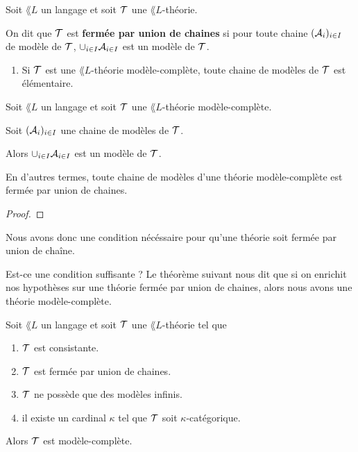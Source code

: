 \documentclass[a4paper, 12pt]{report}
\begin{document}
\begin{definition} 
	Soit $\lang{L}$ un langage et soit $\mathcal{T}$ une $\lang{L}$-théorie.

	On dit que $\mathcal{T}$ est \textbf{fermée par union de chaines} si pour
	toute chaine $(\mathcal{A}_{i})_{i \in I}$ de modèle de $\mathcal{T}$,
	$\cup_{i \in I} \mathcal{A}_{i \in I}$ est un modèle de $\mathcal{T}$.
\end{definition}

\begin{remarque}
	\begin{enumerate}
		\item Si $\mathcal{T}$ est une $\lang{L}$-théorie modèle-complète, toute
			chaine de modèles de $\mathcal{T}$ est élémentaire.
	\end{enumerate}
\end{remarque}

\begin{corollary}
	Soit $\lang{L}$ un langage et soit $\mathcal{T}$ une $\lang{L}$-théorie modèle-complète.

	Soit $(\mathcal{A}_{i})_{i \in I}$ une chaine de modèles de $\mathcal{T}$.

	Alors $\cup_{i \in I} \mathcal{A}_{i \in I}$ est un modèle de $\mathcal{T}$.

	En d'autres termes, toute chaine de modèles d'une théorie modèle-complète est
	fermée par union de chaines.
\end{corollary}

\ifdefined\outputproof
\begin{proof}

\end{proof}
\fi

Nous avons donc une condition nécéssaire pour qu'une théorie soit fermée par
union de chaîne.

Est-ce une condition suffisante ?
Le théorème suivant nous dit que si on enrichit nos hypothèses sur une théorie
fermée par union de chaines, alors nous avons une théorie modèle-complète.

\begin{theorem} 
	Soit $\lang{L}$ un langage et soit $\mathcal{T}$ une $\lang{L}$-théorie tel
	que
	\begin{enumerate}
		\item $\mathcal{T}$ est consistante.
		\item $\mathcal{T}$ est fermée par union de chaines.
		\item $\mathcal{T}$ ne possède que des modèles infinis.
		\item il existe un cardinal $\kappa$ tel que $\mathcal{T}$ soit
			$\kappa$-catégorique.
	\end{enumerate}

	Alors $\mathcal{T}$ est modèle-complète.
\end{theorem}
\end{document}
